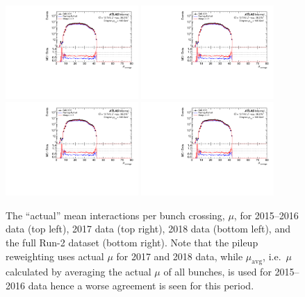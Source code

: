 \begin{figure}[h!]
  \centering
  \includegraphics[page=5,width=0.45\textwidth]{figures/ZjetOmnifoldMCDataComp.pdf}
  \includegraphics[page=6,width=0.45\textwidth]{figures/ZjetOmnifoldMCDataComp.pdf} \\
  \includegraphics[page=7,width=0.45\textwidth]{figures/ZjetOmnifoldMCDataComp.pdf}
  \includegraphics[page=8,width=0.45\textwidth]{figures/ZjetOmnifoldMCDataComp.pdf}
  \caption{The ``actual'' mean interactions per bunch crossing, $\mu$, for 2015--2016 data (top left), 2017 data (top right), 2018 data (bottom left), and the full Run-2 dataset (bottom right). Note that the pileup reweighting uses actual $\mu$ for 2017 and 2018 data, while $\mu_\mathrm{avg}$, i.e.\ $\mu$ calculated by averaging the actual $\mu$ of all bunches, is used for 2015--2016 data hence a worse agreement is seen for this period.}
  \label{fig:MuActual}
\end{figure}

